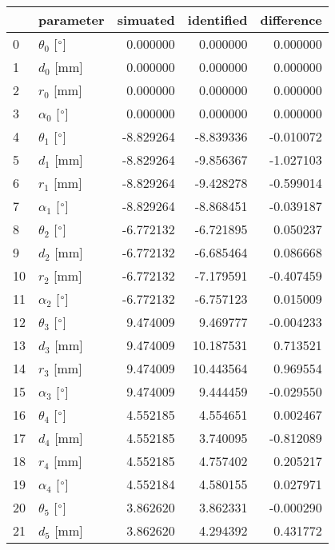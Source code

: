 \documentclass{standalone}%
\begin{document}
%
\normalsize%
\begin{tabular}{llrrr}
\toprule
{} &                 parameter &  simuated & identified & difference \\
\midrule
0  &  $\theta_{0}$ [$\degree$] &  0.000000 &   0.000000 &   0.000000 \\
1  &              $d_{0}$ [mm] &  0.000000 &   0.000000 &   0.000000 \\
2  &              $r_{0}$ [mm] &  0.000000 &   0.000000 &   0.000000 \\
3  &  $\alpha_{0}$ [$\degree$] &  0.000000 &   0.000000 &   0.000000 \\
4  &  $\theta_{1}$ [$\degree$] & -8.829264 &  -8.839336 &  -0.010072 \\
5  &              $d_{1}$ [mm] & -8.829264 &  -9.856367 &  -1.027103 \\
6  &              $r_{1}$ [mm] & -8.829264 &  -9.428278 &  -0.599014 \\
7  &  $\alpha_{1}$ [$\degree$] & -8.829264 &  -8.868451 &  -0.039187 \\
8  &  $\theta_{2}$ [$\degree$] & -6.772132 &  -6.721895 &   0.050237 \\
9  &              $d_{2}$ [mm] & -6.772132 &  -6.685464 &   0.086668 \\
10 &              $r_{2}$ [mm] & -6.772132 &  -7.179591 &  -0.407459 \\
11 &  $\alpha_{2}$ [$\degree$] & -6.772132 &  -6.757123 &   0.015009 \\
12 &  $\theta_{3}$ [$\degree$] &  9.474009 &   9.469777 &  -0.004233 \\
13 &              $d_{3}$ [mm] &  9.474009 &  10.187531 &   0.713521 \\
14 &              $r_{3}$ [mm] &  9.474009 &  10.443564 &   0.969554 \\
15 &  $\alpha_{3}$ [$\degree$] &  9.474009 &   9.444459 &  -0.029550 \\
16 &  $\theta_{4}$ [$\degree$] &  4.552185 &   4.554651 &   0.002467 \\
17 &              $d_{4}$ [mm] &  4.552185 &   3.740095 &  -0.812089 \\
18 &              $r_{4}$ [mm] &  4.552185 &   4.757402 &   0.205217 \\
19 &  $\alpha_{4}$ [$\degree$] &  4.552184 &   4.580155 &   0.027971 \\
20 &  $\theta_{5}$ [$\degree$] &  3.862620 &   3.862331 &  -0.000290 \\
21 &              $d_{5}$ [mm] &  3.862620 &   4.294392 &   0.431772 \\

\end{tabular}
\end{document}
